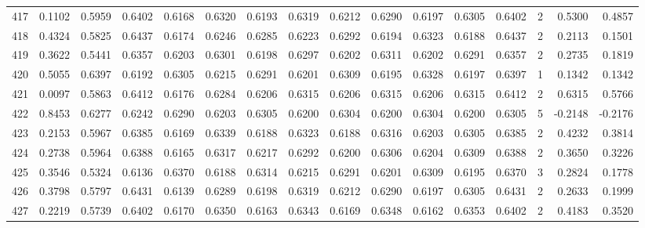 \begin{tabular}{lrrrrrrrrrrrrrrr}
417 &      0.1102 &  0.5959 &  0.6402 &  0.6168 &  0.6320 &  0.6193 &  0.6319 &  0.6212 &  0.6290 &  0.6197 &   0.6305 &     0.6402 &      2 &                    0.5300 &                     0.4857 \\
418 &      0.4324 &  0.5825 &  0.6437 &  0.6174 &  0.6246 &  0.6285 &  0.6223 &  0.6292 &  0.6194 &  0.6323 &   0.6188 &     0.6437 &      2 &                    0.2113 &                     0.1501 \\
419 &      0.3622 &  0.5441 &  0.6357 &  0.6203 &  0.6301 &  0.6198 &  0.6297 &  0.6202 &  0.6311 &  0.6202 &   0.6291 &     0.6357 &      2 &                    0.2735 &                     0.1819 \\
420 &      0.5055 &  0.6397 &  0.6192 &  0.6305 &  0.6215 &  0.6291 &  0.6201 &  0.6309 &  0.6195 &  0.6328 &   0.6197 &     0.6397 &      1 &                    0.1342 &                     0.1342 \\
421 &      0.0097 &  0.5863 &  0.6412 &  0.6176 &  0.6284 &  0.6206 &  0.6315 &  0.6206 &  0.6315 &  0.6206 &   0.6315 &     0.6412 &      2 &                    0.6315 &                     0.5766 \\
422 &      0.8453 &  0.6277 &  0.6242 &  0.6290 &  0.6203 &  0.6305 &  0.6200 &  0.6304 &  0.6200 &  0.6304 &   0.6200 &     0.6305 &      5 &                   -0.2148 &                    -0.2176 \\
423 &      0.2153 &  0.5967 &  0.6385 &  0.6169 &  0.6339 &  0.6188 &  0.6323 &  0.6188 &  0.6316 &  0.6203 &   0.6305 &     0.6385 &      2 &                    0.4232 &                     0.3814 \\
424 &      0.2738 &  0.5964 &  0.6388 &  0.6165 &  0.6317 &  0.6217 &  0.6292 &  0.6200 &  0.6306 &  0.6204 &   0.6309 &     0.6388 &      2 &                    0.3650 &                     0.3226 \\
425 &      0.3546 &  0.5324 &  0.6136 &  0.6370 &  0.6188 &  0.6314 &  0.6215 &  0.6291 &  0.6201 &  0.6309 &   0.6195 &     0.6370 &      3 &                    0.2824 &                     0.1778 \\
426 &      0.3798 &  0.5797 &  0.6431 &  0.6139 &  0.6289 &  0.6198 &  0.6319 &  0.6212 &  0.6290 &  0.6197 &   0.6305 &     0.6431 &      2 &                    0.2633 &                     0.1999 \\
427 &      0.2219 &  0.5739 &  0.6402 &  0.6170 &  0.6350 &  0.6163 &  0.6343 &  0.6169 &  0.6348 &  0.6162 &   0.6353 &     0.6402 &      2 &                    0.4183 &                     0.3520 \\

\end{tabular}
